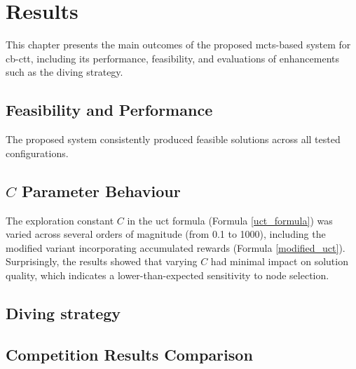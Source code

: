 \chapter{Results}

\label{Results}

This chapter presents the main outcomes of the proposed \ac{mcts}-based system for \ac{cb-ctt}, including its performance, feasibility, and evaluations of enhancements such as the diving strategy.

\section{Feasibility and Performance}

The proposed system consistently produced feasible solutions across all tested configurations.

\section{\(C\) Parameter Behaviour}

The exploration constant \(C\) in the \ac{uct} formula (Formula \ref{uct_formula}) was varied across several orders of magnitude (from 0.1 to 1000), including the modified variant incorporating accumulated rewards (Formula \ref{modified_uct}). Surprisingly, the results showed that varying \(C\) had minimal impact on solution quality, which indicates a lower-than-expected sensitivity to node selection.

\section{Diving strategy}

\section{Competition Results Comparison}